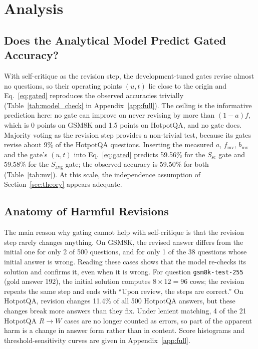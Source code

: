 \section{Analysis}
\label{sec:analysis}

\subsection{Does the Analytical Model Predict Gated Accuracy?}
\label{sec:assumption}
With self-critique as the revision step, the development-tuned gates revise almost no questions, so their operating points $(u,t)$ lie close to the origin and Eq.~\eqref{eq:gated} reproduces the observed accuracies trivially (Table~\ref{tab:model_check} in Appendix~\ref{app:full}). The ceiling is the informative prediction here: no gate can improve on never revising by more than $(1-a)f$, which is 0 points on GSM8K and 1.5 points on HotpotQA, and no gate does. Majority voting as the revision step provides a non-trivial test, because its gates revise about 9\% of the HotpotQA questions. Inserting the measured $a$, $f_{\text{mv}}$, $b_{\text{mv}}$ and the gate's $(u,t)$ into Eq.~\eqref{eq:gated} predicts 59.56\% for the $S_{\text{sc}}$ gate and 59.58\% for the $S_{\text{avg}}$ gate; the observed accuracy is 59.50\% for both (Table~\ref{tab:mv}). At this scale, the independence assumption of Section~\ref{sec:theory} appears adequate.

\subsection{Anatomy of Harmful Revisions}
\begin{table}[ht]
\centering
\caption{Analysis of harmful revisions ($R\to W$) under always-revise on HotpotQA ($N=400$). Comparing exact match (EM) against lenient string containment reveals how many apparent errors arise from surface format drift rather than semantic loss.}
\label{tab:format_drift}

\end{table}

The main reason why gating cannot help with self-critique is that the revision step rarely changes anything. On GSM8K, the revised answer differs from the initial one for only 2 of 500 questions, and for only 1 of the 38 questions whose initial answer is wrong. Reading these cases shows that the model re-checks its solution and confirms it, even when it is wrong. For question \texttt{gsm8k-test-255} (gold answer 192), the initial solution computes $8 \times 12 = 96$ cows; the revision repeats the same step and ends with ``Upon review, the steps are correct.'' On HotpotQA, revision changes 11.4\% of all 500 HotpotQA answers, but these changes break more answers than they fix. Under lenient matching, 4 of the 21 HotpotQA $R\to W$ cases are no longer counted as errors, so part of the apparent harm is a change in answer form rather than in content. Score histograms and threshold-sensitivity curves are given in Appendix~\ref{app:full}.
